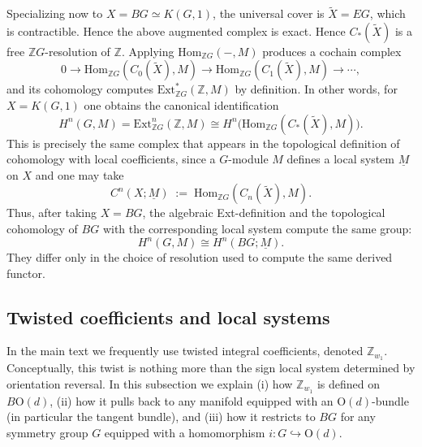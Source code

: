 \documentclass[aps,prx,reprint,superscriptaddress,twocolumn,amsmath,amssymb,amsfonts, nofootinbib]{revtex4-2}
\newcommand{\Z}{\mathbb{Z}}
\theoremstyle{apsstyle}
\begin{document}
Specializing now to $X=BG\simeq K(G,1)$, the universal cover is $\widetilde X=EG$, which is contractible. Hence the above augmented complex is exact. Hence $C_\ast(\widetilde{X})$ is a free $\mathbb{Z}G$-resolution of $\mathbb{Z}$. Applying $\mathrm{Hom}_{\mathbb{Z}G}(-,M)$ produces a cochain complex
\begin{equation}
    0 \longrightarrow \mathrm{Hom}_{\mathbb{Z}G}(C_0(\widetilde{X}),M)
    \longrightarrow \mathrm{Hom}_{\mathbb{Z}G}(C_1(\widetilde{X}),M)
    \longrightarrow \cdots,
\end{equation}
and its cohomology computes $\mathrm{Ext}^\ast_{\mathbb{Z}G}(\mathbb{Z},M)$ by definition. In other words, for $X=K(G,1)$ one obtains the canonical identification
\begin{equation}
    H^n(G,M)=
    \mathrm{Ext}^n_{\mathbb{Z}G}(\mathbb{Z},M)\cong H^n\!\big(\mathrm{Hom}_{\mathbb{Z}G}(C_\ast(\widetilde{X}),M)\big).
\end{equation}
This is precisely the same complex that appears in the topological definition of cohomology with local coefficients, since a $G$-module $M$ defines a local system $\underline{M}$ on $X$ and one may take
\begin{equation}
    C^n(X;\underline{M})
    \;:=\;
    \mathrm{Hom}_{\mathbb{Z}G}(C_n(\widetilde{X}),M).
\end{equation}
Thus, after taking $X=BG$, the algebraic Ext-definition and the topological cohomology of $BG$ with the corresponding local system compute the same group:
\begin{equation*}
    H^n(G,M)\cong H^n(BG;\underline M).
\end{equation*}
They differ only in the choice of resolution used to compute the same derived functor.

 
\subsection{Twisted coefficients and local systems}
\label{app:twisted_coefficients}

In the main text we frequently use twisted integral coefficients, denoted $\Z_{w_{1}}$. Conceptually, this twist is nothing more than the sign local system determined by orientation reversal. In this subsection we explain (i) how $\Z_{w_{1}}$ is defined on $B\mathrm{O}(d)$, (ii) how it pulls back to any manifold equipped with an $\mathrm{O}(d)$-bundle (in particular the tangent bundle), and (iii) how it restricts to $BG$ for any symmetry group $G$ equipped with a homomorphism $i:G\hookrightarrow \mathrm{O}(d)$.
\end{document}
